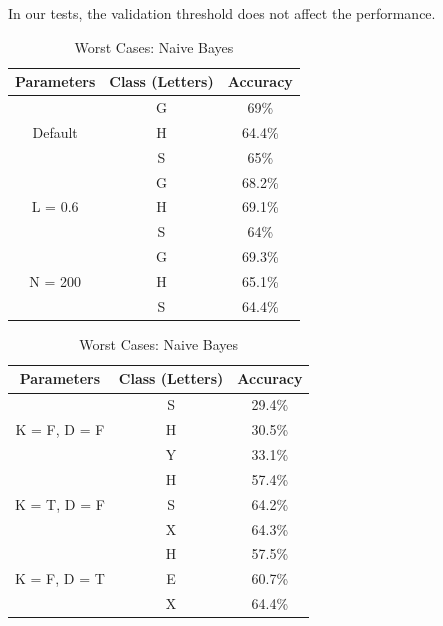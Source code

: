 \documentclass[11pt]{article}
\begin{document}
In our tests, the validation threshold does not affect the performance.
 
 \begin{table}[!htb]

\centering
\begin{minipage}{0.46\columnwidth}
\begin{tabular}{c  c  c} \hline

Parameters & Class (Letters) & Accuracy \\\hline
\multirow{3}{*}{Default} & G & 69\% \\
	& H & 64.4\% \\
	& S & 65\% \\\hline
\multirow{3}{*}{L = 0.6} & G & 68.2\% \\
	& H & 69.1\% \\
	& S & 64\% \\\hline
\multirow{3}{*}{N = 200} & G & 69.3\% \\
	& H & 65.1\% \\
	& S & 64.4\% \\\hline
\end{tabular}
\caption{Worst Cases: Multilayer Perceptron} %
\label{tbl:ann}
\end{minipage}
\hfill
\begin{minipage}{0.46\columnwidth}
\begin{tabular}{c  c  c} \hline

Parameters & Class (Letters) & Accuracy \\\hline
\multirow{3}{*}{K = F, D = F} & S & 29.4\% \\
	& H & 30.5\% \\
	& Y & 33.1\% \\\hline
\multirow{3}{*}{K = T, D = F} & H & 57.4\% \\
	& S & 64.2\% \\
	& X & 64.3\% \\\hline
\multirow{3}{*}{K = F, D = T} & H & 57.5\% \\
	& E & 60.7\% \\
	& X & 64.4\% \\\hline
\end{tabular}
\caption{Worst Cases: Naive Bayes} %
\label{tbl:bayes}
\end{minipage}
\end{table}
\end{document}
